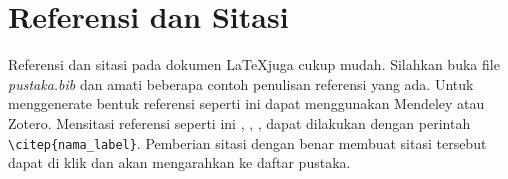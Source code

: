 \section{Referensi dan Sitasi}
Referensi dan sitasi pada dokumen \LaTeX juga cukup mudah. Silahkan buka file \textit{pustaka.bib} dan amati beberapa contoh penulisan referensi yang ada. Untuk menggenerate bentuk referensi seperti ini dapat menggunakan Mendeley atau Zotero. Mensitasi referensi seperti ini \citep{Priambodo_2021}, \citep{Nasuha_2017}, \citep{Dhewa_Dharmawan_Priyambodo_2017}, \citep{Arifin_2015} dapat dilakukan dengan perintah \verb|\citep{nama_label}|. Pemberian sitasi dengan benar membuat sitasi tersebut dapat di klik dan akan mengarahkan ke daftar pustaka.